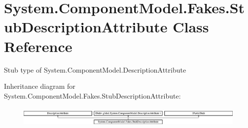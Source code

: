 \hypertarget{class_system_1_1_component_model_1_1_fakes_1_1_stub_description_attribute}{\section{System.\-Component\-Model.\-Fakes.\-Stub\-Description\-Attribute Class Reference}
\label{class_system_1_1_component_model_1_1_fakes_1_1_stub_description_attribute}
}


Stub type of System.\-Component\-Model.\-Description\-Attribute 


Inheritance diagram for System.\-Component\-Model.\-Fakes.\-Stub\-Description\-Attribute\-:\begin{figure}[H]
\begin{center}
\leavevmode
\includegraphics[height=1.017257cm]{class_system_1_1_component_model_1_1_fakes_1_1_stub_description_attribute}
\end{center}
\end{figure}
